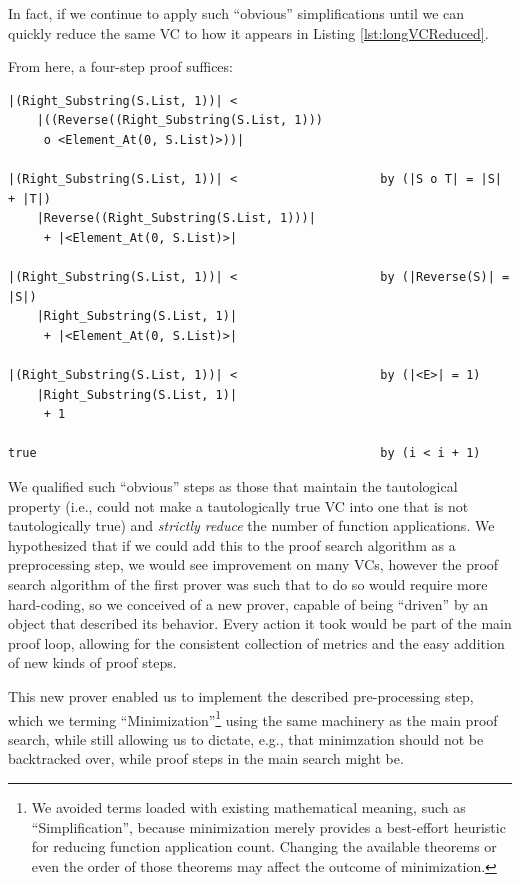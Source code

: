 In fact, if we continue to apply such ``obvious'' simplifications until we can quickly reduce the same VC to how it appears in Listing \ref{lst:longVCReduced}.



From here, a four-step proof suffices:

\begin{lstlisting}
|(Right_Substring(S.List, 1))| < 
	|((Reverse((Right_Substring(S.List, 1)))
	 o <Element_At(0, S.List)>))|

|(Right_Substring(S.List, 1))| <                    by (|S o T| = |S| + |T|)
	|Reverse((Right_Substring(S.List, 1)))|
	 + |<Element_At(0, S.List)>|

|(Right_Substring(S.List, 1))| <                    by (|Reverse(S)| = |S|)
	|Right_Substring(S.List, 1)|
	 + |<Element_At(0, S.List)>|

|(Right_Substring(S.List, 1))| <                    by (|<E>| = 1)
	|Right_Substring(S.List, 1)|
	 + 1

true                                                by (i < i + 1)
\end{lstlisting}

We qualified such ``obvious'' steps as those that maintain the tautological property (i.e., could not make a tautologically true VC into one that is not tautologically true) and \emph{strictly reduce} the number of function applications.  We hypothesized that if we could add this to the proof search algorithm as a preprocessing step, we would see improvement on many VCs, however the proof search algorithm of the first prover was such that to do so would require more hard-coding, so we conceived of a new prover, capable of being ``driven'' by an object that described its behavior.  Every action it took would be part of the main proof loop, allowing for the consistent collection of metrics and the easy addition of new kinds of proof steps.

This new prover enabled us to implement the described pre-processing step, which we terming ``Minimization''\footnote{We avoided terms loaded with existing mathematical meaning, such as ``Simplification'', because minimization merely provides a best-effort heuristic for reducing function application count.  Changing the available theorems or even the order of those theorems may affect the outcome of minimization.} using the same machinery as the main proof search, while still allowing us to dictate, e.g., that minimzation should not be backtracked over, while proof steps in the main search might be.

